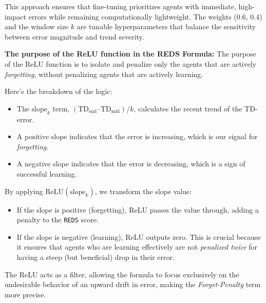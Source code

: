 
This approach ensures that fine-tuning prioritizes agents with immediate, high-impact errors while remaining computationally lightweight. The weights (0.6, 0.4) and the window size $k$ are tunable hyperparameters that balance the sensitivity between error magnitude and trend severity.



\textbf{The purpose of the ReLU function in the REDS Formula: }
The purpose of the ReLU function is to isolate and penalize only the agents that are actively \textit{forgetting}, without penalizing agents that are actively learning.

Here's the breakdown of the logic:
\begin{itemize}
    \item The $\text{slope}_k$ term, $(\text{TD}_{\text{end}} – \text{TD}_{\text{mid}}) / k$, calculates the recent trend of the TD-error.
    \item A positive slope indicates that the error is increasing, which is our signal for \textit{forgetting}.
    \item A negative slope indicates that the error is decreasing, which is a sign of successful learning.
\end{itemize}
By applying $\text{ReLU}(\text{slope}_k)$, we transform the slope value:
\begin{itemize}
    \item If the slope is positive (forgetting), ReLU passes the value through, adding a penalty to the \texttt{REDS} score.
    \item If the slope is negative (learning), ReLU outputs zero. This is crucial because it ensures that agents who are learning effectively are not \textit{penalized twice} for having a steep (but beneficial) drop in their error.
\end{itemize}
The ReLU acts as a filter, allowing the formula to focus exclusively on the undesirable behavior of an upward drift in error, making the \textit{Forget-Penalty} term more precise.
